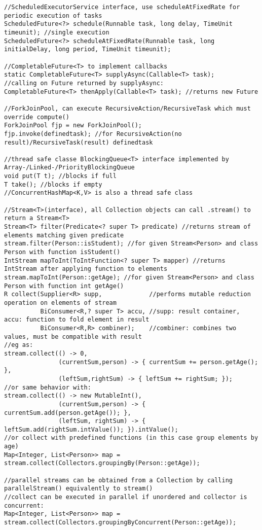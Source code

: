 \documentclass{article}
\begin{document}
\begin{verbatim}
//ScheduledExecutorService interface, use scheduleAtFixedRate for periodic execution of tasks
ScheduledFuture<?> schedule(Runnable task, long delay, TimeUnit timeunit); //single execution
ScheduledFuture<?> scheduleAtFixedRate(Runnable task, long initialDelay, long period, TimeUnit timeunit);

//CompletableFuture<T> to implement callbacks
static CompletableFuture<T> supplyAsync(Callable<T> task);
//calling on Future returned by supplyAsync:
CompletableFuture<T> thenApply(Callable<T> task); //returns new Future

//ForkJoinPool, can execute RecursiveAction/RecursiveTask which must override compute()
ForkJoinPool fjp = new ForkJoinPool();
fjp.invoke(definedtask); //for RecursiveAction(no result)/RecursiveTask(result) definedtask

//thread safe classe BlockingQueue<T> interface implemented by Array-/Linked-/PriorityBlockingQueue
void put(T t); //blocks if full
T take(); //blocks if empty
//ConcurrentHashMap<K,V> is also a thread safe class

//Stream<T>(interface), all Collection objects can call .stream() to return a Stream<T>
Stream<T> filter(Predicate<? super T> predicate) //returns stream of elements matching given predicate
stream.filter(Person::isStudent); //for given Stream<Person> and class Person with function isStudent()
IntStream mapToInt(ToIntFunction<? super T> mapper) //returns IntStream after applying function to elements
stream.mapToInt(Person::getAge); //for given Stream<Person> and class Person with function int getAge()
R collect(Supplier<R> supp,             //performs mutable reduction operation on elements of stream
          BiConsumer<R,? super T> accu, //supp: result container, accu: function to fold element in result
          BiConsumer<R,R> combiner);    //combiner: combines two values, must be compatible with result
//eg as:
stream.collect(() -> 0,
               (currentSum,person) -> { currentSum += person.getAge(); },
               (leftSum,rightSum) -> { leftSum += rightSum; });
//or same behavior with:
stream.collect(() -> new MutableInt(),
               (currentSum,person) -> { currentSum.add(person.getAge()); },
               (leftSum, rightSum) -> { leftSum.add(rightSum.intValue()); }).intValue();
//or collect with predefined functions (in this case group elements by age)
Map<Integer, List<Person>> map = stream.collect(Collectors.groupingBy(Person::getAge));

//parallel streams can be obtained from a Collection by calling parallelStream() equivalently to stream()
//collect can be executed in parallel if unordered and collector is concurrent:
Map<Integer, List<Person>> map = stream.collect(Collectors.groupingByConcurrent(Person::getAge));

\end{verbatim}
\end{document}
